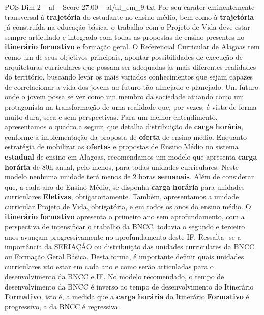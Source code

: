 \begin{textsample}{POS Dim 2 – al – Score 27.00 – al/al\_em\_9.txt}
Por seu caráter eminentemente transversal à \textbf{trajetória} do estudante no ensino médio, bem como à \textbf{trajetória} já construída na educação básica, o trabalho com o Projeto de Vida deve estar sempre articulado e integrado com todas as propostas de ensino presentes no \textbf{itinerário} \textbf{formativo} e formação geral.
O Referencial Curricular de Alagoas tem como um de seus objetivos principais, apontar possibilidades de execução de arquiteturas curriculares que possam ser adequadas às mais diferentes realidades do território, buscando levar os mais variados conhecimentos que sejam capazes de correlacionar a vida dos jovens ao futuro tão almejado e planejado.
Um futuro onde o jovem possa se ver como um membro da sociedade atuando como um protagonista na transformação de uma realidade que, por vezes, é vista de forma muito dura, seca e sem perspectivas.
Para um melhor entendimento, apresentamos o quadro a seguir, que detalha distribuição de \textbf{carga} \textbf{horária}, conforme a implementação da proposta de \textbf{oferta} de ensino médio.
Enquanto estratégia de mobilizar as \textbf{ofertas} e propostas de Ensino Médio no sistema \textbf{estadual} de ensino em Alagoas, recomendamos um modelo que apresenta \textbf{carga} \textbf{horária} de 80h anual, pelo menos, para todas unidades curriculares.
Neste modelo nenhuma unidade terá menos de 2 horas \textbf{semanais}.
Além de considerar que, a cada ano do Ensino Médio, se disponha \textbf{carga} \textbf{horária} para unidades curriculares \textbf{Eletivas}, obrigatoriamente.
Também, apresentamos a unidade curricular Projeto de Vida, obrigatória, e em todos os anos do ensino médio.
O \textbf{itinerário} \textbf{formativo} apresenta o primeiro ano sem aprofundamento, com a perspectiva de intensificar o trabalho da BNCC, todavia o segundo e terceiro anos avançam progressivamente no aprofundamento deste IF.
Ressalta -se a importância da SERIAÇÃO ou distribuição das unidades curriculares da BNCC ou Formação Geral Básica.
Desta forma, é importante definir quais unidades curriculares vão estar em cada ano e como serão articuladas para o desenvolvimento da BNCC e IF.
No modelo recomendado, o tempo de desenvolvimento da BNCC é inverso ao tempo de desenvolvimento do Itinerário \textbf{Formativo}, isto é, a medida que a \textbf{carga} \textbf{horária} do Itinerário \textbf{Formativo} é progressivo, a da BNCC é regressiva.

\end{textsample}
